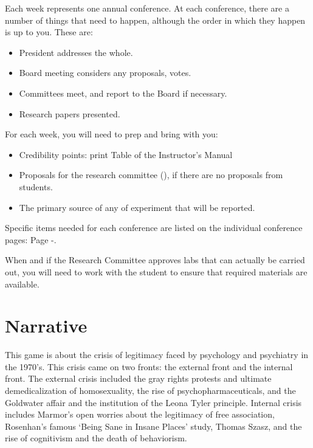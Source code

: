 \begin{refsection}
Each week represents one annual conference. At each conference, there are a number of things that need to happen, although the order in which they happen is up to you. These are:

\begin{itemize}
\item President addresses the whole.

\item Board meeting considers any proposals, votes.

\item Committees meet, and report to the Board if necessary.

\item Research papers presented.

\end{itemize}

For each week, you will need to prep and bring with you:

\begin{itemize}
\item Credibility points: print Table  of the Instructor's Manual

\item Proposals for the research committee (), if there are no proposals from students.

\item The primary source of any  of experiment that will be reported.

\end{itemize}

Specific items needed for each conference are listed on the individual conference pages: Page \pageref{1971}-\pageref{1975}.

When and if the Research Committee approves labs that can actually be carried out, you will need to work with the student to ensure that required materials are available.

\section{Narrative}
\label{narrative}

This game is about the crisis of legitimacy faced by psychology and psychiatry in the 1970’s. This crisis came on two fronts: the external front and the internal front. The external crisis included the gray rights protests and ultimate demedicalization of homosexuality, the rise of psychopharmaceuticals, and the Goldwater affair and the institution of the Leona Tyler principle. Internal crisis includes Marmor’s open worries about the legitimacy of free association, Rosenhan’s famous ‘Being Sane in Insane Places’ study, Thomas Szasz, and the rise of cognitivism and the death of behaviorism.


\end{refsection}
